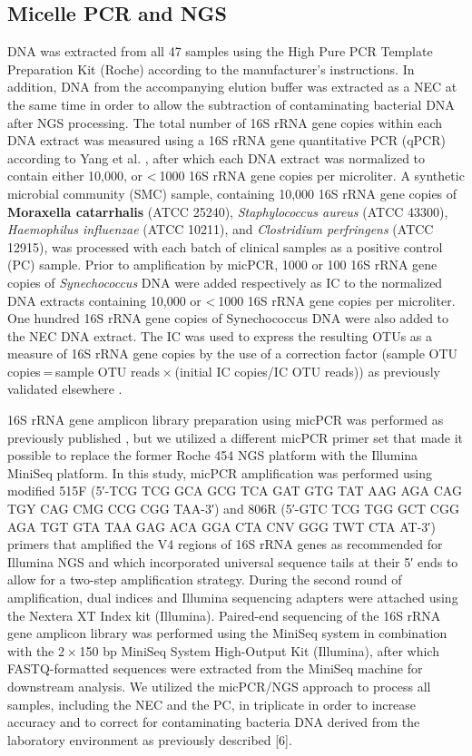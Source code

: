 \subsection*{Micelle PCR and NGS}

DNA was extracted from all 47 samples using the High Pure PCR Template Preparation Kit (Roche) according to the manufacturer’s instructions.
In addition, DNA from the accompanying elution buffer was extracted as a NEC at the same time in order to allow the subtraction of contaminating
bacterial DNA after NGS processing. The total number of 16S rRNA gene copies within each DNA extract was measured using a 16S rRNA gene
quantitative PCR (qPCR) according to Yang et al. \cite{yang2002quantitative}, after which each DNA extract was normalized to contain either 10,000, or < 1000 16S rRNA
gene copies per microliter. A synthetic microbial community (SMC) sample, containing 10,000 16S rRNA gene copies of \textbf{Moraxella catarrhalis} (ATCC 25240),
\textit{Staphylococcus aureus} (ATCC 43300), \textit{Haemophilus influenzae} (ATCC 10211), and \textit{Clostridium perfringens} (ATCC 12915), was processed with each batch
of clinical samples as a positive control (PC) sample. Prior to amplification by micPCR, 1000 or 100 16S rRNA gene copies of \textit{Synechococcus} DNA
were added respectively as IC to the normalized DNA extracts containing 10,000 or < 1000 16S rRNA gene copies per microliter. One hundred 16S
rRNA gene copies of Synechococcus DNA were also added to the NEC DNA extract. The IC was used to express the resulting OTUs as a measure of
16S rRNA gene copies by the use of a correction factor (sample OTU copies = sample OTU reads × (initial IC copies/IC OTU reads)) as previously
validated elsewhere \cite{boers2017novel}.

16S rRNA gene amplicon library preparation using micPCR was performed as previously published \cite{boers2017novel}, but we utilized a different micPCR primer
set that made it possible to replace the former Roche 454 NGS platform with the Illumina MiniSeq platform. In this study, micPCR amplification
was performed using modified 515F (5′-TCG TCG GCA GCG TCA GAT GTG TAT AAG AGA CAG TGY CAG CMG CCG CGG TAA-3′) and 806R
(5′-GTC TCG TGG GCT CGG AGA TGT GTA TAA GAG ACA GGA CTA CNV GGG TWT CTA AT-3′) primers that amplified the V4 regions of 16S rRNA genes
as recommended for Illumina NGS and which incorporated universal sequence tails at their 5′ ends to allow for a two-step amplification
strategy. During the second round of amplification, dual indices and Illumina sequencing adapters were attached using the Nextera XT
Index kit (Illumina). Paired-end sequencing of the 16S rRNA gene amplicon library was performed using the MiniSeq system in combination
with the 2 × 150 bp MiniSeq System High-Output Kit (Illumina), after which FASTQ-formatted sequences were extracted from the MiniSeq
machine for downstream analysis. We utilized the micPCR/NGS approach to process all samples, including the NEC and the PC, in triplicate
in order to increase accuracy and to correct for contaminating bacteria DNA derived from the laboratory environment as previously described [6].

